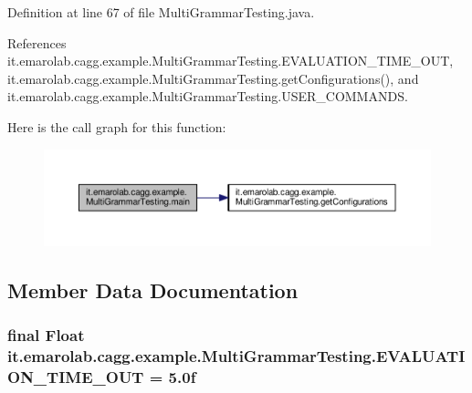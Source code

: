 Definition at line 67 of file Multi\-Grammar\-Testing.\-java.



References it.\-emarolab.\-cagg.\-example.\-Multi\-Grammar\-Testing.\-E\-V\-A\-L\-U\-A\-T\-I\-O\-N\-\_\-\-T\-I\-M\-E\-\_\-\-O\-U\-T, it.\-emarolab.\-cagg.\-example.\-Multi\-Grammar\-Testing.\-get\-Configurations(), and it.\-emarolab.\-cagg.\-example.\-Multi\-Grammar\-Testing.\-U\-S\-E\-R\-\_\-\-C\-O\-M\-M\-A\-N\-D\-S.



Here is the call graph for this function\-:\nopagebreak
\begin{figure}[H]
\begin{center}
\leavevmode
\includegraphics[width=350pt]{classit_1_1emarolab_1_1cagg_1_1example_1_1MultiGrammarTesting_ad327a10a31b545b5fb7cc5e484ed0fde_cgraph}
\end{center}
\end{figure}




\subsection{Member Data Documentation}
\hypertarget{classit_1_1emarolab_1_1cagg_1_1example_1_1MultiGrammarTesting_a42d0af8d9a108af6c67e43eac1ee659e}{
\subsubsection[{E\-V\-A\-L\-U\-A\-T\-I\-O\-N\-\_\-\-T\-I\-M\-E\-\_\-\-O\-U\-T}]{\setlength{\rightskip}{0pt plus 5cm}final Float it.\-emarolab.\-cagg.\-example.\-Multi\-Grammar\-Testing.\-E\-V\-A\-L\-U\-A\-T\-I\-O\-N\-\_\-\-T\-I\-M\-E\-\_\-\-O\-U\-T = 5.\-0f\hspace{0.3cm}{\ttfamily [static]}}}\label{classit_1_1emarolab_1_1cagg_1_1example_1_1MultiGrammarTesting_a42d0af8d9a108af6c67e43eac1ee659e}


